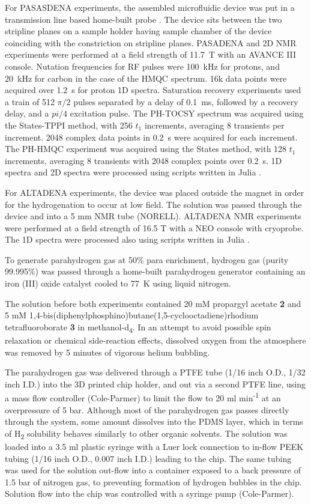 For PASASDENA experiments, the assembled microfluidic device was put in a transmission line based
home-built probe \cite{RN164}. The
device sits between the two stripline planes on a sample holder having
sample chamber of the device coinciding with the constriction on
stripline planes. PASADENA and 2D NMR experiments were performed at a field strength
of 11.7~T with an AVANCE III console. Nutation frequencies for RF pulses
were 100~kHz for protons, and 20~kHz for carbon in the case of the HMQC
spectrum. 16k data points were acquired over 1.2~s for proton 1D spectra.
Saturation recovery experiments used a train of 512 $\pi/2$ pulses
separated by a delay of 0.1~ms, followed by a recovery delay, and a $pi/4$
excitation pulse.
The PH-TOCSY spectrum was acquired using the States-TPPI method,
with 256 $t_1$ increments, averaging 8 transients per increment.
2048 complex data points in 0.2~s were acquired for each increment.
The PH-HMQC experiment was acquired using the States method, with
128 $t_1$ increments, averaging 8 transients with 2048 complex points
over 0.2~s. 1D spectra and
2D spectra were processed using scripts written in Julia \cite{Bezanson:2017gd}.

For ALTADENA experiments, the device was placed outside the magnet in order
for the hydrogenation to occur at low field. The solution was passed through the
device and into a 5 mm NMR tube (NORELL). ALTADENA NMR experiments were performed at
a field strength of 16.5 T with a NEO console with cryoprobe. The 1D spectra
were processed also using scripts written in Julia \cite{Bezanson:2017gd}.

To generate parahydrogen gas at 50\% para enrichment, hydrogen gas
(purity 99.995\%) was passed through a home-built parahydrogen generator
containing an iron (III) oxide catalyst cooled to 77~K using liquid
nitrogen.

The solution before both experiments contained 20 mM propargyl acetate \textbf{2}
and 5 mM
1,4-bis(diphenyl\-phosphino)\-butane(1,5-cyclo\-octadiene)\-rhodium
tetra\-fluoro\-borate \textbf{3} in methanol-d\textsubscript{4}. In an attempt to
avoid possible spin relaxation or chemical side-reaction effects,
dissolved oxygen from the atmosphere was removed by 5 minutes of
vigorous helium bubbling.

The parahydrogen gas was delivered through a PTFE tube (1/16 inch O.D.,
1/32 inch I.D.) into the 3D printed chip holder, and out via a second
PTFE line, using a mass flow controller (Cole-Parmer) to limit the flow
to 20 ml min\textsuperscript{-1} at an overpressure of 5 bar. Although
most of the parahydrogen gas passes directly through the system, some
amount dissolves into the PDMS layer, which in terms of
H\textsubscript{2} solubility behaves similarly to other organic
solvents. The solution was loaded into a 3.5 ml plastic syringe with a
Luer lock connection to in-flow PEEK tubing (1/16 inch O.D., 0.007 inch
I.D.) leading to the chip. The same tubing was used for the solution
out-flow into a container exposed to a back pressure of 1.5 bar of
nitrogen gas, to preventing formation of hydrogen bubbles in the chip.
Solution flow into the chip was controlled with a syringe pump (Cole-Parmer).

